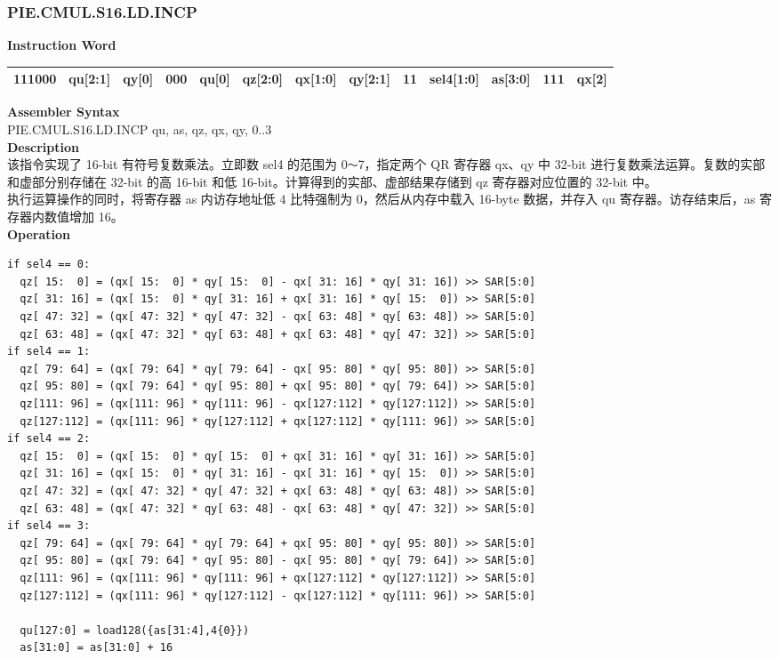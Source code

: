 \newpage
\subsubsection{PIE.CMUL.S16.LD.INCP}\label{instruction:PIECMULS16LDINCP}
\setlength\tabcolsep{6pt}
\textbf{Instruction Word} \\
\begin{tabular}{|c|c|c|c|c|c|c|c|c|c|c|c|c|}
	\hline
	111000 & qu[2:1] & qy[0] & 000 & qu[0] & qz[2:0] & qx[1:0] & qy[2:1] & 11 & sel4[1:0] & as[3:0] & 111 & qx[2] \\
	\hline
\end{tabular}

\textbf{Assembler Syntax} \\
PIE.CMUL.S16.LD.INCP qu, as, qz, qx, qy, 0..3 \\
\textbf{Description} \\
该指令实现了 16-bit 有符号复数乘法。立即数 sel4 的范围为 0\verb+～+7，指定两个 QR 寄存器 qx、qy 中 32-bit 进行复数乘法运算。复数的实部和虚部分别存储在 32-bit 的高 16-bit 和低 16-bit。计算得到的实部、虚部结果存储到 qz 寄存器对应位置的 32-bit 中。\\ 执行运算操作的同时，将寄存器 as 内访存地址低 4 比特强制为 0，然后从内存中载入 16-byte 数据，并存入 qu 寄存器。访存结束后，as 寄存器内数值增加 16。\\
\textbf{Operation}
\begin{lstlisting}
if sel4 == 0:
  qz[ 15:  0] = (qx[ 15:  0] * qy[ 15:  0] - qx[ 31: 16] * qy[ 31: 16]) >> SAR[5:0]
  qz[ 31: 16] = (qx[ 15:  0] * qy[ 31: 16] + qx[ 31: 16] * qy[ 15:  0]) >> SAR[5:0]
  qz[ 47: 32] = (qx[ 47: 32] * qy[ 47: 32] - qx[ 63: 48] * qy[ 63: 48]) >> SAR[5:0]
  qz[ 63: 48] = (qx[ 47: 32] * qy[ 63: 48] + qx[ 63: 48] * qy[ 47: 32]) >> SAR[5:0]
if sel4 == 1:
  qz[ 79: 64] = (qx[ 79: 64] * qy[ 79: 64] - qx[ 95: 80] * qy[ 95: 80]) >> SAR[5:0]
  qz[ 95: 80] = (qx[ 79: 64] * qy[ 95: 80] + qx[ 95: 80] * qy[ 79: 64]) >> SAR[5:0]
  qz[111: 96] = (qx[111: 96] * qy[111: 96] - qx[127:112] * qy[127:112]) >> SAR[5:0]
  qz[127:112] = (qx[111: 96] * qy[127:112] + qx[127:112] * qy[111: 96]) >> SAR[5:0]
if sel4 == 2:
  qz[ 15:  0] = (qx[ 15:  0] * qy[ 15:  0] + qx[ 31: 16] * qy[ 31: 16]) >> SAR[5:0]
  qz[ 31: 16] = (qx[ 15:  0] * qy[ 31: 16] - qx[ 31: 16] * qy[ 15:  0]) >> SAR[5:0]
  qz[ 47: 32] = (qx[ 47: 32] * qy[ 47: 32] + qx[ 63: 48] * qy[ 63: 48]) >> SAR[5:0]
  qz[ 63: 48] = (qx[ 47: 32] * qy[ 63: 48] - qx[ 63: 48] * qy[ 47: 32]) >> SAR[5:0]
if sel4 == 3:
  qz[ 79: 64] = (qx[ 79: 64] * qy[ 79: 64] + qx[ 95: 80] * qy[ 95: 80]) >> SAR[5:0]
  qz[ 95: 80] = (qx[ 79: 64] * qy[ 95: 80] - qx[ 95: 80] * qy[ 79: 64]) >> SAR[5:0]
  qz[111: 96] = (qx[111: 96] * qy[111: 96] + qx[127:112] * qy[127:112]) >> SAR[5:0]
  qz[127:112] = (qx[111: 96] * qy[127:112] - qx[127:112] * qy[111: 96]) >> SAR[5:0]

  qu[127:0] = load128({as[31:4],4{0}})
  as[31:0] = as[31:0] + 16
\end{lstlisting}


